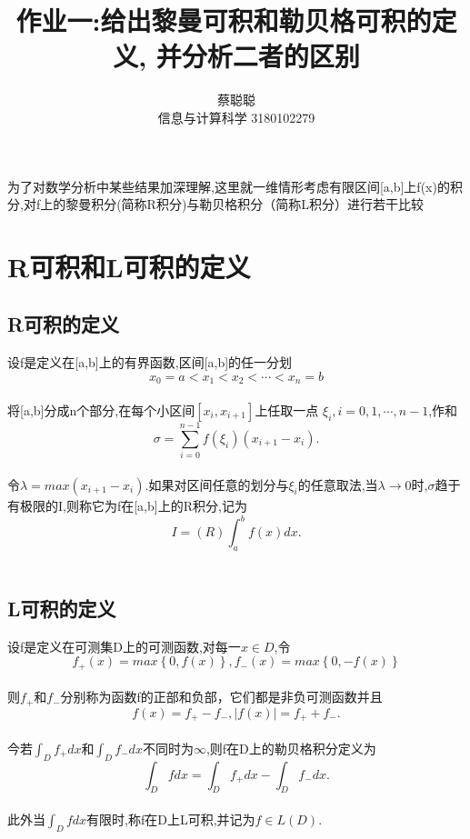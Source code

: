 \documentclass{ctexart}
\title{作业一:给出黎曼可积和勒贝格可积的定义, 并分析二者的区别}
\author{蔡聪聪 \\ 信息与计算科学 3180102279}
\begin{document}
\maketitle


为了对数学分析中某些结果加深理解,这里就一维情形考虑有限区间[a,b]上f(x)的积分,对f上的黎曼积分(简称R积分)与勒贝格积分（简称L积分）进行若干比较
\section{R可积和L可积的定义}
\subsection{R可积的定义}
设f是定义在[a,b]上的有界函数,区间[a,b]的任一分划\\
\begin{equation*}
  x_0=a<x_1<x_2<\cdots<x_n=b
\end{equation*}\\
将[a,b]分成n个部分,在每个小区间$[x_{i},x_{i+1}]$上任取一点 $\xi_i,i=0,1,\cdots,n-1$,作和\\
\begin{equation}
  \sigma=\sum\limits_{i=0}^{n-1}f(\xi_i)(x_{i+1}-x_i).
\end{equation}\\
令$\lambda=max(x_{i+1}-x_i)$.如果对区间任意的划分与$\xi_i$的任意取法,当$\lambda\xrightarrow[]{}0$时,$\sigma$趋于有极限的I,则称它为f在[a,b]上的R积分,记为\\
\begin{equation}
I=(R)\int_a^bf(x)dx.
\end{equation}\\

\subsection{L可积的定义}
设f是定义在可测集D上的可测函数,对每一$x\in D$,令\\
\begin{equation}
f_{+}(x)=max\left\{0,f(x)\right\},f_{-}(x)=max\left\{0,-f(x)\right\}
\end{equation}\\
则$f_{+}$和$f_{-}$分别称为函数f的正部和负部，它们都是非负可测函数并且\\
\begin{equation}
f(x)=f_{+}-f_{-},|f(x)|=f_{+}+f_{-}.
\end{equation}\\
今若$\int_Df_{+}dx$和$\int_Df_{-}dx$不同时为$\infty$,则f在D上的勒贝格积分定义为\\
\begin{equation}
\int_Dfdx=\int_Df_{+}dx-\int_Df_{-}dx.
\end{equation}\\
此外当$\int_Dfdx$有限时,称f在D上L可积,并记为$f\in L(D)$.
\end{document}
